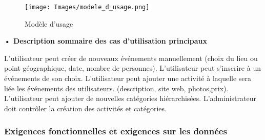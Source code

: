 \begin{figure}[H]
	\centerline{\texttt{[image: Images/modele\_d\_usage.png]}}
	\caption{Modèle d'usage}
\end{figure}


\textbf{• Description sommaire des cas d’utilisation principaux}

L’utilisateur peut créer de nouveaux événements manuellement (choix du lieu ou point géographique, date, nombre de personnes).
L’utilisateur peut s’inscrire à un événements de son choix.
L’utilisateur peut ajouter une activité à laquelle sera liée les événements des utilisateurs. (description, site web, photos,prix).
L'utilisateur peut ajouter de nouvelles catégories hiérarchisées.
L'administrateur doit contrôler la création des activités et catégories.

\subsubsection{Exigences fonctionnelles et exigences sur les données}

